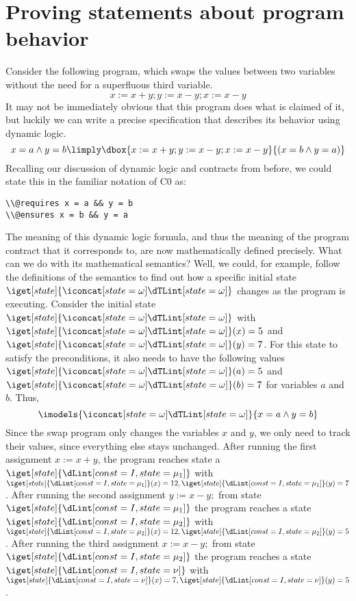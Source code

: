 \documentclass[11pt,twoside]{scrartcl}
\begin{document}
\section{Proving statements about program behavior}

Consider the following program, which swaps the values between two variables without the need for a superfluous third variable.
\begin{equation}
x:=x+y; y:=x-y; x:=x-y
\end{equation}
It may not be immediately obvious that this program does what is claimed of it, but luckily we can write a precise specification that describes its behavior using dynamic logic.
\begin{equation}
{x=a\land y=b\limply\dbox{x:=x+y; y:=x-y; x:=x-y}{(x=b\land y=a)}}
\label{eq:swap}
\end{equation}
Recalling our discussion of dynamic logic and contracts from before, we could state this in the familiar notation of C0 as:
\begin{verbatim}
\\@requires x = a && y = b
\\@ensures x = b && y = a
\end{verbatim}
The meaning of this dynamic logic formula, and thus the meaning of the program contract that it corresponds to, are now mathematically defined precisely.
What can we do with its mathematical semantics?
Well, we could, for example, follow the definitions of the semantics to find out how a specific initial state \(\iget[state]{\I}\) changes as the program is executing.
Consider the initial state \(\iget[state]{\I}\) with \(\iget[state]{\I}(x)=5\) and \(\iget[state]{\I}(y)=7\).
For this state to satisfy the preconditions, it also needs to have the following values \(\iget[state]{\I}(a)=5\) and \(\iget[state]{\I}(b)=7\) for variables $a$ and $b$.
Thus,
\[
\imodels{\I}{x=a\land y=b}
\]
Since the swap program only changes the variables $x$ and $y$, we only need to track their values, since everything else stays unchanged.
After running the first assignment \(x:=x+y\), the program reaches state a \(\iget[state]{\Iz[1]}\) with \(\iget[state]{\Iz[1]}(x)=12,\iget[state]{\Iz[1]}(y)=7\).
After running the second assignment \(y:=x-y;\) from state \(\iget[state]{\Iz[1]}\) the program reaches a state \(\iget[state]{\Iz[2]}\) with \(\iget[state]{\Iz[2]}(x)=12,\iget[state]{\Iz[2]}(y)=5\).
After running the third assignment \(x:=x-y;\) from state \(\iget[state]{\Iz[2]}\) the program reaches a state \(\iget[state]{\It}\) with \(\iget[state]{\It}(x)=7,\iget[state]{\It}(y)=5\).
\end{document}

